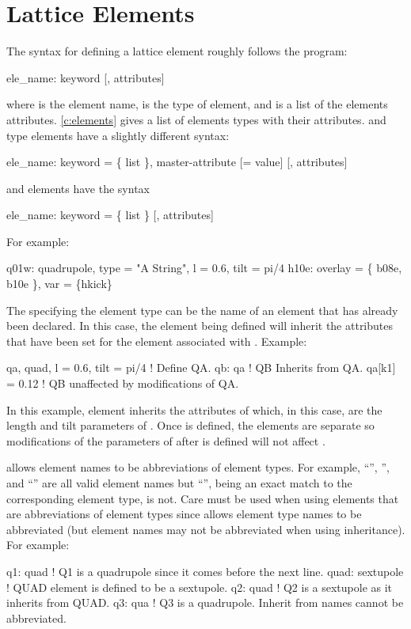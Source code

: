 \section{Lattice Elements}

The syntax for defining a lattice element roughly follows the
\mad\cite{b:maduser} program:
\begin{example}
  ele_name: keyword [, attributes]
\end{example}
where  is the element name,  is the type of element, and  is
a list of the elements attributes. \cref{c:elements} gives a list of elements types with their
attributes.   and  type elements have a slightly different syntax:
\begin{example}
  ele_name: keyword = \{ list \}, master-attribute [= value] [, attributes]
\end{example}
and  elements have the syntax
\begin{example}
  ele_name: keyword = \{ list \} [, attributes]
\end{example}  
For example:
\begin{example}
  q01w: quadrupole, type = "A String", l = 0.6, tilt = pi/4
  h10e: overlay = \{ b08e, b10e \}, var = \{hkick\}
\end{example}

The  specifying the element type can be the name of an element that has already been
declared. In this case, the element being defined will inherit the attributes that have been
set for the element associated with . Example:
\begin{example}
  qa, quad, l = 0.6, tilt = pi/4  ! Define QA.
  qb: qa                          ! QB Inherits from QA.
  qa[k1] = 0.12                   ! QB unaffected by modifications of QA.
\end{example}
In this example, element  inherits the attributes of  which, in this case, are the
length and tilt parameters of . Once  is defined, the elements are separate so 
modifications of the parameters of  after  is defined will not affect .

\bmad allows element names to be abbreviations of element types. For example, ``'', '',
and ``'' are all valid element names but ``'', being an exact match to
the corresponding element type, is not. Care must be used when using elements that are abbreviations
of element types since \bmad allows element type names to be abbreviated (but element names may not
be abbreviated when using inheritance). For example:
\begin{example}
  q1: quad          ! Q1 is a quadrupole since it comes before the next line.
  quad: sextupole   ! QUAD element is defined to be a sextupole.
  q2: quad          ! Q2 is a sextupole as it inherits from QUAD.
  q3: qua           ! Q3 is a quadrupole. Inherit from names cannot be abbreviated.
\end{example}

